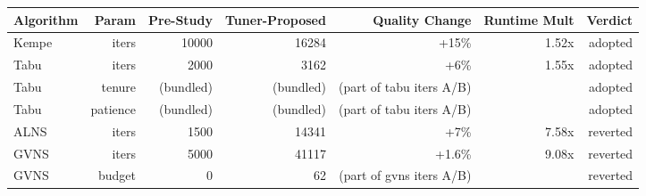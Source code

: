 \begin{tabular}{lrrrrrr}
\toprule
Algorithm & Param & Pre-Study & Tuner-Proposed & Quality Change & Runtime Mult & Verdict \\
\midrule
Kempe & iters & 10000 & 16284 & +15\% & 1.52x & adopted \\
Tabu & iters & 2000 & 3162 & +6\% & 1.55x & adopted \\
Tabu & tenure & (bundled) & (bundled) & (part of tabu iters A/B) &  & adopted \\
Tabu & patience & (bundled) & (bundled) & (part of tabu iters A/B) &  & adopted \\
ALNS & iters & 1500 & 14341 & +7\% & 7.58x & reverted \\
GVNS & iters & 5000 & 41117 & +1.6\% & 9.08x & reverted \\
GVNS & budget & 0 & 62 & (part of gvns iters A/B) &  & reverted \\
\bottomrule
\end{tabular}
